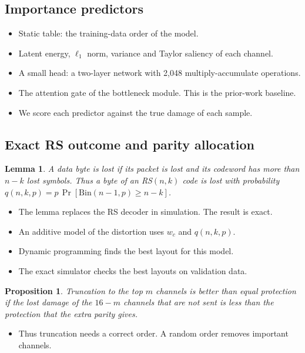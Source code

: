 \documentclass[journal]{IEEEtran}
\newtheorem{lemma}{Lemma}
\newtheorem{proposition}{Proposition}
\begin{document}
\subsection{Importance predictors}
\begin{itemize}
\item Static table: the training-data order of the model.
\item Latent energy, $\ell_1$ norm, variance and Taylor saliency of each channel.
\item A small head: a two-layer network with 2,048 multiply-accumulate operations.
\item The attention gate of the bottleneck module. This is the prior-work baseline.
\item We score each predictor against the true damage of each sample.
\end{itemize}

\subsection{Exact RS outcome and parity allocation}
\begin{lemma}
A data byte is lost if its packet is lost and its codeword has more than $n-k$ lost symbols.
Thus a byte of an RS$(n,k)$ code is lost with probability $q(n,k,p)=p\,\Pr[\mathrm{Bin}(n-1,p)\ge n-k]$.
\end{lemma}
\begin{itemize}
\item The lemma replaces the RS decoder in simulation. The result is exact.
\item An additive model of the distortion uses $w_c$ and $q(n,k,p)$.
\item Dynamic programming finds the best layout for this model.
\item The exact simulator checks the best layouts on validation data.
\end{itemize}
\begin{proposition}
Truncation to the top $m$ channels is better than equal protection if the lost damage of the
$16-m$ channels that are not sent is less than the protection that the extra parity gives.
\end{proposition}
\begin{itemize}
\item Thus truncation needs a correct order. A random order removes important channels.
\end{itemize}
\end{document}

